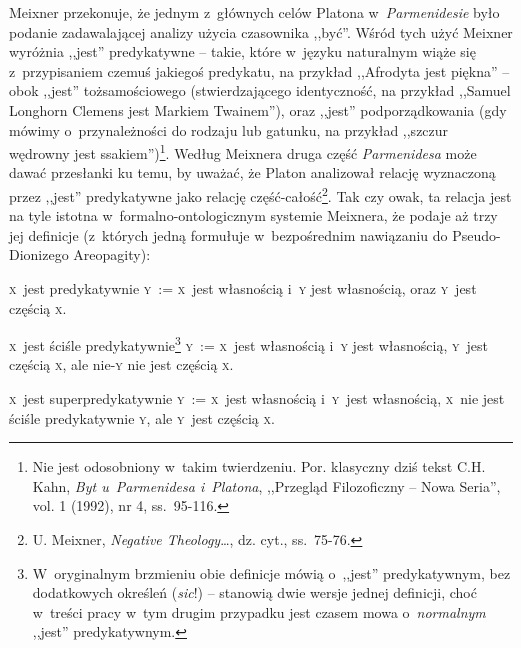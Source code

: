 Meixner przekonuje, że jednym z~głównych celów Platona w~\textit{Parmenidesie} było podanie zadawalającej analizy użycia czasownika ,,być''. Wśród tych użyć Meixner wyróżnia ,,jest'' predykatywne -- takie, które w~języku naturalnym wiąże się z~przypisaniem czemuś jakiegoś predykatu, na przykład ,,Afrodyta jest piękna'' -- obok ,,jest'' tożsamościowego (stwierdzającego identyczność, na przykład ,,Samuel Longhorn Clemens jest Markiem Twainem''), oraz ,,jest'' podporządkowania (gdy mówimy o~przynależności do rodzaju lub gatunku, na przykład ,,szczur wędrowny jest ssakiem'')\footnote{Nie jest odosobniony w~takim twierdzeniu. Por. klasyczny dziś tekst C.H. Kahn, \textit{Byt u~Parmenidesa i~Platona}, ,,Przegląd Filozoficzny -- Nowa Seria'', vol. 1 (1992), nr 4, ss.~95-116.}. Według Meixnera druga część \textit{Parmenidesa} może dawać przesłanki ku temu, by uważać, że Platon analizował relację wyznaczoną przez ,,jest'' predykatywne jako relację część-całość\footnote{U. Meixner, \textit{Negative Theology}\ldots, dz. cyt., ss.~75-76.}. Tak czy owak, ta relacja jest na tyle istotna w~formalno-ontologicznym systemie Meixnera, że podaje aż trzy jej definicje (z~których jedną formułuje w~bezpośrednim nawiązaniu do Pseudo-Dionizego Areopagity):
\begin{defin}\label{mei-def3}
\textsc{x}~jest predykatywnie \textsc{y}~:= \textsc{x}~jest własnością i~\textsc{y} jest własnością, oraz \textsc{y}~jest częścią \textsc{x}.
\end{defin}
\begin{defin}\label{mei-def4}
\textsc{x}~jest ściśle predykatywnie\footnote{W~oryginalnym brzmieniu obie definicje mówią o~,,jest'' predykatywnym, bez dodatkowych określeń (\textit{\textit{sic}}!) -- stanowią dwie wersje jednej definicji, choć w~treści pracy w~tym drugim przypadku jest czasem mowa o~\textit{normalnym} ,,jest'' predykatywnym.} \textsc{y}~:= \textsc{x}~jest własnością i~\textsc{y} jest własnością, \textsc{y}~jest częścią \textsc{x}, ale nie-\textsc{y} nie jest częścią \textsc{x}.
\end{defin}
\begin{defin}\label{mei-def5}
\textsc{x}~jest superpredykatywnie \textsc{y}~:= \textsc{x}~jest własnością i~\textsc{y}~jest własnością, \textsc{x}~nie jest ściśle predykatywnie \textsc{y}, ale \textsc{y}~jest częścią \textsc{x}.
\end{defin}
%
%
%

